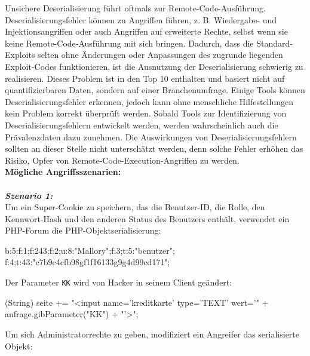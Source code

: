 Unsichere Deserialisierung führt oftmals zur Remote-Code-Ausführung. Deserialisierungsfehler können zu Angriffen führen, z. B. Wiedergabe- und Injektionsangriffen oder auch Angriffen auf erweiterte Rechte, selbst wenn sie keine Remote-Code-Ausführung mit sich bringen. Dadurch, dass die Standard-Exploits selten ohne Änderungen oder Anpassungen des zugrunde liegenden Exploit-Codes funktionieren, ist die Ausnutzung der Deserialisierung schwierig zu realisieren. Dieses Problem ist in den Top 10 enthalten und basiert nicht auf quantifizierbaren Daten, sondern auf einer Branchenumfrage. Einige Tools können Deserialisierungsfehler erkennen, jedoch kann ohne menschliche Hilfestellungen kein Problem korrekt überprüft werden. Sobald Tools zur Identifizierung von Deserialisierungsfehlern entwickelt werden, werden wahrscheinlich auch die Prävalenzdaten dazu zunehmen. Die Auswirkungen von Deserialisierungsfehlern sollten an dieser Stelle nicht unterschätzt werden, denn solche Fehler erhöhen das Risiko, Opfer von Remote-Code-Execution-Angriffen zu werden\cite[13]{owasp17top10}.\\

\textbf{Mögliche Angriffsszenarien:}\\
\\
\textbf{\textit{Szenario 1:}}\\

Um ein Super-Cookie zu speichern, das die Benutzer-ID, die Rolle, den
Kennwort-Hash und den anderen Status des Benutzers enthält, verwendet ein
PHP-Forum die PHP-Objektserialisierung\cite[13]{owasp17top10}:\\

\begin{LaTeXCode}[caption={Unsichere Deserialisierung - Beispiel 1},captionpos=b, label=LaTeXCode:ud1][numbers=none]
b:5:{f:1;f:243;f:2;u:8:"Mallory";f:3;t:5:"benutzer";
f:4;t:43:"c7b9c4cfb98gf1f16133g9g4d99cd171";}
\end{LaTeXCode}

Der Parameter \texttt{KK} wird von Hacker in seinem Client geändert:\\

\begin{LaTeXCode}[caption={Unsichere Deserialisierung - Beispiel 2},captionpos=b, label=LaTeXCode:ud2][numbers=none]
	(String) seite += "<input name='kreditkarte' type='TEXT'
	wert='" + anfrage.gibParameter("KK") + "'>";
\end{LaTeXCode}

Um sich Administratorrechte zu geben, modifiziert ein Angreifer das serialisierte Objekt:\\

